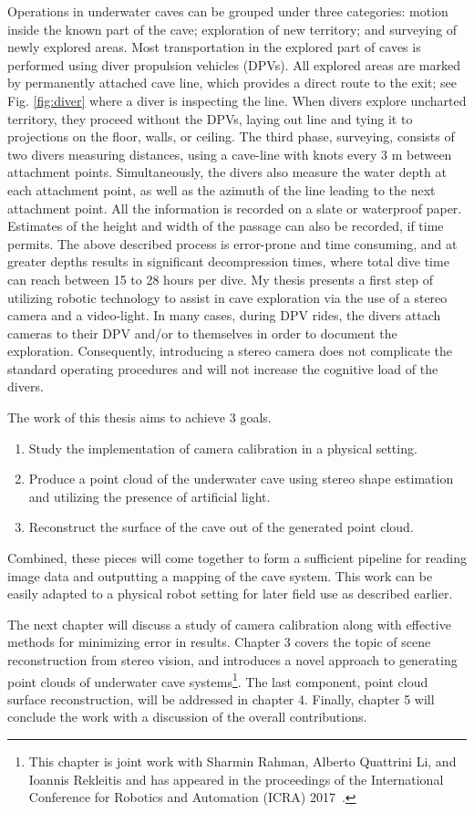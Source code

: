 Operations in underwater caves can be grouped under three categories: motion inside the known part of the cave; exploration of new territory; and surveying of newly explored areas. Most transportation in the explored part of caves is performed using diver propulsion vehicles (DPVs). All explored areas are marked by permanently attached cave line, which provides a direct route to the exit; see Fig. \ref{fig:diver} where a diver is inspecting the line. When divers explore uncharted territory, they proceed without the DPVs, laying out line and tying it to projections on the floor, walls, or ceiling. The third phase, surveying, consists of two divers measuring distances, using a cave\hyp line with knots every 3 m between attachment points. Simultaneously, the divers also measure the water depth at each attachment point, as well as the azimuth of the line leading to the next attachment point. All the information is recorded on a slate or waterproof paper. Estimates of the height and width of the passage can also be recorded, if time permits. The above described process is error\hyp prone and time consuming, and at greater depths results in significant decompression times, where total dive time can reach between 15 to 28 hours per dive. My thesis presents a first step of utilizing robotic technology to assist in cave exploration via the use of a stereo camera and a video\hyp light.  In many cases, during DPV rides, the divers attach cameras to their DPV and/or to themselves in order to document the exploration. Consequently, introducing a stereo camera does not complicate the standard operating procedures and will not increase the cognitive load of the divers.

The work of this thesis aims to achieve 3 goals.
\begin{enumerate}
	\item Study the implementation of camera calibration in a physical setting.
	\item Produce a point cloud of the underwater cave using stereo shape estimation and utilizing the presence of artificial light. 
	\item Reconstruct the surface of the cave out of the generated point cloud.
\end{enumerate} Combined, these pieces will come together to form a sufficient pipeline for reading image data and outputting a mapping of the cave system. This work can be easily adapted to a physical robot setting for later field use as described earlier. 

The next chapter will discuss a study of camera calibration along with effective methods for minimizing error in results. Chapter 3 covers the topic of scene reconstruction from stereo vision, and introduces a novel approach to generating point clouds of underwater cave systems\footnote{This chapter is joint work with Sharmin Rahman, Alberto Quattrini Li, and Ioannis Rekleitis and has appeared in the proceedings of the International Conference for Robotics and Automation (ICRA) 2017~\cite{weidner2017}.}. The last component, point cloud surface reconstruction, will be addressed in chapter 4. Finally, chapter 5 will conclude the work with a discussion of the overall contributions.